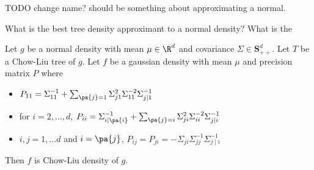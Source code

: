 
























\sstart
{}

TODO change name?
should be something about approximating a normal.

What is the best tree density approximant to a normal density?
What is the


\begin{prop}


Let $g$ be a normal density with mean $\mu \in \R^d$ and covariance $\Sigma \in \mathbf{S}^d_{++}$.
Let $T$ be a Chow-Liu tree of $g$.
Let $f$ be a gaussian density with mean $\mu$ and precision matrix $P$ where
  \begin{itemize}
    \item $P_{11} = \Sigma_{11}^{-1} + \sum_{\pa{j} = 1}
\Sigma_{j1}^2\Sigma_{11}^{-2}\Sigma_{j\mid 1}^{-1}$
      \item for $i = 2, \dots, d$, $P_{ii} = \Sigma_{i\mid\pa{i}}^{-1} + \sum_{\pa{j} = i} \Sigma_{ji}^2\Sigma_{ii}^{-2}\Sigma_{j\mid i}^{-1}$
      \item $i, j = 1, \dots d$ and $i = \pa{j}$, $P_{ij} = P_{ji} = -\Sigma_{ji}\Sigma_{jj}^{-1}\Sigma_{j \mid i}^{-1}$
  \end{itemize}
  Then $f$ is Chow-Liu density of $g$.
\end{prop}
\strats
